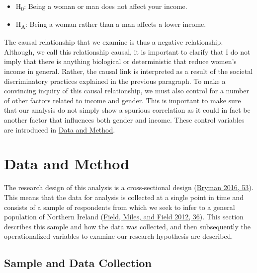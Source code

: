 \documentclass[
]{article}
\providecommand{\tightlist}{%
  \setlength{\itemsep}{0pt}\setlength{\parskip}{0pt}}
\begin{document}
\begin{itemize}
\tightlist
\item
  H\textsubscript{0}: Being a woman or man does not affect your income.
\item
  H\textsubscript{A}: Being a woman rather than a man affects a lower
  income.
\end{itemize}

The causal relationship that we examine is thus a negative relationship.
Although, we call this relationship causal, it is important to clarify
that I do not imply that there is anything biological or deterministic
that reduce women's income in general. Rather, the causal link is
interpreted as a result of the societal discriminatory practices
explained in the previous paragraph. To make a convincing inquiry of
this causal relationship, we must also control for a number of other
factors related to income and gender. This is important to make sure
that our analysis do not simply show a spurious correlation as it could
in fact be another factor that influences both gender and income. These
control variables are introduced in
\protect\hyperlink{data-and-method}{Data and Method}.

\pagebreak

\hypertarget{data-and-method}{%
\section{Data and Method}\label{data-and-method}}

The research design of this analysis is a cross-sectional design
(\protect\hyperlink{ref-bryman2016social}{Bryman 2016, 53}). This means
that the data for analysis is collected at a single point in time and
consists of a sample of respondents from which we seek to infer to a
general population of Northern Ireland
(\protect\hyperlink{ref-field2012discovering}{Field, Miles, and Field
2012, 36}). This section describes this sample and how the data was
collected, and then subsequently the operationalized variables to
examine our research hypothesis are described.

\hypertarget{sample-and-data-collection}{%
\subsection{Sample and Data
Collection}\label{sample-and-data-collection}}
\end{document}
